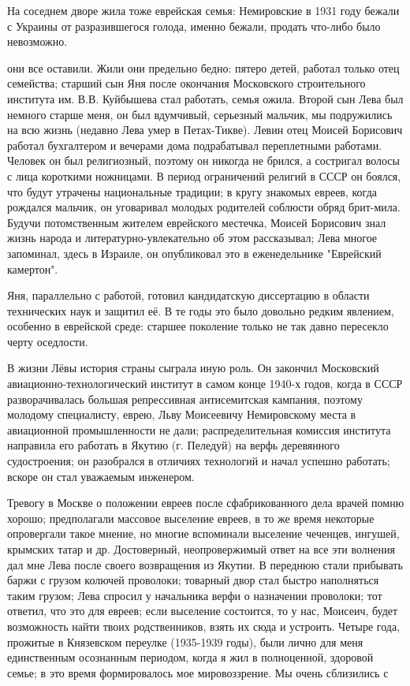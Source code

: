 На соседнем дворе жила тоже еврейская семья: Немировские в 1931 году бежали с Украины от разразившегося голода, именно бежали, продать что-либо было невозможно.

они все оставили. Жили они предельно бедно: пятеро детей, работал только отец семейства; старший сын Яня после окончания Московского строительного института им. В.В. Куйбышева стал работать, семья ожила. Второй сын Лева был немного старше меня, он был вдумчивый, серьезный мальчик, мы подружились на всю жизнь (недавно Лева умер в Петах-Тикве). Левин отец Моисей Борисович работал бухгалтером и вечерами дома подрабатывал переплетными работами. Человек он был религиозный, поэтому он никогда не брился, а состригал волосы с лица короткими ножницами. В период ограничений религий в СССР он боялся, что будут утрачены национальные традиции; в кругу знакомых евреев, когда рождался мальчик, он уговаривал молодых родителей соблюсти обряд брит-мила. Будучи потомственным жителем еврейского местечка, Моисей Борисович знал жизнь народа и литературно-увлекательно об этом рассказывал; Лева многое запоминал, здесь в Израиле, он опубликовал это в еженедельнике "Еврейский камертон".

Яня, параллельно с работой, готовил кандидатскую диссертацию в области технических наук и защитил её. В те годы это было довольно редким явлением, особенно в еврейской среде: старшее поколение только не так давно пересекло черту оседлости.

В жизни Лёвы история страны сыграла иную роль. Он закончил Московский авиационно-технологический институт в самом конце 1940-х годов, когда в СССР разворачивалась большая репрессивная антисемитская кампания, поэтому молодому специалисту, еврею, Льву Моисеевичу Немировскому места в авиационной промышленности не дали; распределительная комиссия института направила его работать в Якутию (г. Пеледуй) на верфь деревянного судостроения; он разобрался в отличиях технологий и начал успешно работать; вскоре он стал уважаемым инженером.

Тревогу в Москве о положении евреев после сфабрикованного дела врачей помню хорошо; предполагали массовое выселение евреев, в то же время некоторые опровергали такое мнение, но многие вспоминали выселение чеченцев, ингушей, крымских татар и др. Достоверный, неопровержимый ответ на все эти волнения дал мне Лева после своего возвращения из Якутии. В переднюю стали прибывать баржи с грузом колючей проволоки; товарный двор стал быстро наполняться таким грузом; Лева спросил у начальника верфи о назначении проволоки; тот ответил, что это для евреев; если выселение состоится, то у нас, Моисеич, будет возможность найти твоих родственников, взять их сюда и устроить. Четыре года, прожитые в Князевском переулке (1935-1939 годы), были лично для меня единственным осознанным периодом, когда я жил в полноценной, здоровой семье; в это время формировалось мое мировоззрение. Мы очень сблизились с

